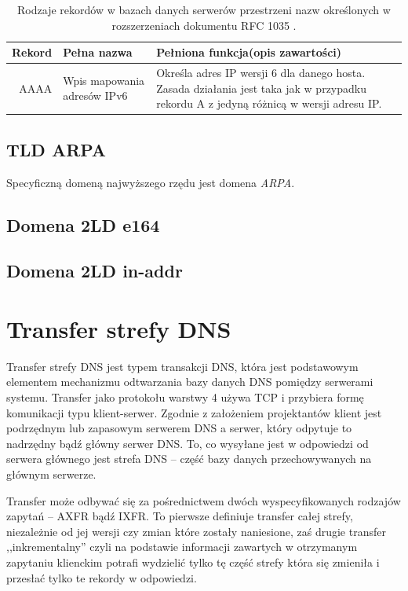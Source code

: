 \begin{table}[]
	\centering
	\caption{Rodzaje rekordów w bazach danych serwerów przestrzeni nazw określonych w rozszerzeniach dokumentu RFC 1035 \cite{}.}
	\label{typyRekordowDnsExt}
	\begin{tabular}{|r|p{3cm}|p{8cm}|}
		\hline
		\textbf{Rekord} & 
		\textbf{Pełna nazwa} & 
		\textbf{Pełniona funkcja(opis zawartości)} \\
		\hline\hline
			AAAA & 
			Wpis mapowania adresów IPv6 & 
			Określa adres IP wersji 6 dla danego hosta. Zasada działania jest taka jak w przypadku rekordu A z jedyną różnicą w wersji adresu IP. \\
		\hline
	\end{tabular}
\end{table}

\subsection{TLD ARPA}
Specyficzną domeną najwyższego rzędu jest domena \textit{ARPA}.

\subsection{Domena 2LD e164}

\subsection{Domena 2LD in-addr}

\section{Transfer strefy DNS}
Transfer strefy DNS jest typem transakcji DNS, która jest podstawowym elementem mechanizmu odtwarzania bazy danych DNS pomiędzy serwerami systemu. Transfer jako protokołu warstwy 4 używa TCP i przybiera formę komunikacji typu klient-serwer. Zgodnie z założeniem projektantów klient jest podrzędnym lub zapasowym serwerem DNS a serwer, który odpytuje to nadrzędny bądź główny serwer DNS. To, co wysyłane jest w odpowiedzi od serwera głównego jest strefa DNS -- część bazy danych przechowywanych na głównym serwerze. 

Transfer może odbywać się za pośrednictwem dwóch wyspecyfikowanych rodzajów zapytań -- AXFR\cite{RFC1034, RFC5936} bądź IXFR\cite{RFC1995}. To pierwsze definiuje transfer całej strefy, niezależnie od jej wersji czy zmian które zostały naniesione, zaś drugie transfer ,,inkrementalny'' czyli na podstawie informacji zawartych w otrzymanym zapytaniu klienckim potrafi wydzielić tylko tę część strefy która się zmieniła i przesłać tylko te rekordy w odpowiedzi.

